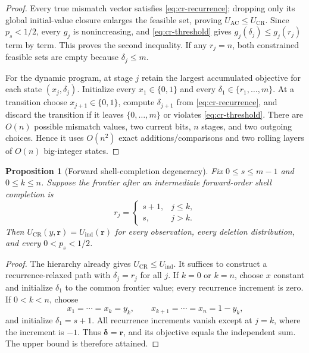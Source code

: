 \documentclass[11pt]{article}
\newtheorem{proposition}[theorem]{Proposition}
\theoremstyle{remark}
\begin{document}
\begin{proof}
Every true mismatch vector satisfies \eqref{eq:cr-recurrence}; dropping only its global
initial-value closure enlarges the feasible set, proving
$U_{\mathrm{AC}}\le U_{\mathrm{CR}}$. Since $p_s<1/2$, every $g_j$ is nonincreasing,
and \eqref{eq:cr-threshold} gives $g_j(\delta_j)\le g_j(r_j)$ term by term. This proves
the second inequality. If any $r_j=n$, both constrained feasible sets are empty because
$\delta_j\le m$.

For the dynamic program, at stage $j$ retain the largest accumulated objective for each
state $(x_j,\delta_j)$. Initialize every $x_1\in\{0,1\}$ and every
$\delta_1\in\{r_1,\ldots,m\}$. At a transition choose $x_{j+1}\in\{0,1\}$, compute
$\delta_{j+1}$ from \eqref{eq:cr-recurrence}, and discard the transition if it leaves
$\{0,\ldots,m\}$ or violates \eqref{eq:cr-threshold}. There are $O(n)$ possible mismatch
values, two current bits, $n$ stages, and two outgoing choices. Hence it uses $O(n^2)$ exact additions/comparisons and two rolling layers of $O(n)$ big-integer states.
\end{proof}

\begin{proposition}[Forward shell-completion degeneracy]
Fix $0\le s\le m-1$ and $0\le k\le n$. Suppose the frontier after an intermediate
forward-order shell completion is
\[
 r_j=\begin{cases}s+1,&j\le k,\\s,&j>k.\end{cases}
\]
Then $U_{\mathrm{CR}}(y,\mathbf r)=U_{\mathrm{ind}}(\mathbf r)$ for every observation,
every deletion distribution, and every $0<p_s<1/2$.
\end{proposition}

\begin{proof}
The hierarchy already gives $U_{\mathrm{CR}}\le U_{\mathrm{ind}}$. It suffices to
construct a recurrence-relaxed path with $\delta_j=r_j$ for all $j$. If $k=0$ or $k=n$,
choose $x$ constant and initialize $\delta_1$ to the common frontier value; every
recurrence increment is zero. If $0<k<n$, choose
\[
 x_1=\cdots=x_k=y_k,\qquad
 x_{k+1}=\cdots=x_n=1-y_k,
\]
and initialize $\delta_1=s+1$. All recurrence increments vanish except at $j=k$, where
the increment is $-1$. Thus $\boldsymbol\delta=\mathbf r$, and its objective equals the
independent sum. The upper bound is therefore attained.
\end{proof}
\end{document}
